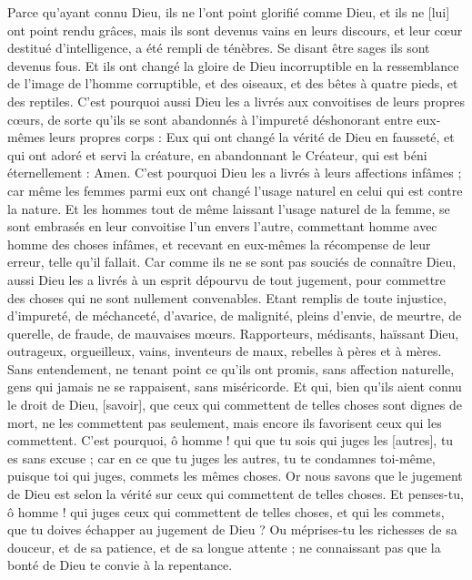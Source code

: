 \begin{multicols}{2}
Parce qu'ayant connu Dieu, ils ne l'ont point glorifié comme Dieu, et ils ne [lui] ont point rendu grâces, mais ils sont devenus vains en leurs discours, et leur cœur destitué d'intelligence, a été rempli de ténèbres.
Se disant être sages ils sont devenus fous.
Et ils ont changé la gloire de Dieu incorruptible en la ressemblance de l'image de l'homme corruptible, et des oiseaux, et des bêtes à quatre pieds, et des reptiles.
C'est pourquoi aussi Dieu les a livrés aux convoitises de leurs propres cœurs, de sorte qu'ils se sont abandonnés à l'impureté déshonorant entre eux-mêmes leurs propres corps :
Eux qui ont changé la vérité de Dieu en fausseté, et qui ont adoré et servi la créature, en abandonnant le Créateur, qui est béni éternellement : Amen.
C'est pourquoi Dieu les a livrés à leurs affections infâmes ; car même les femmes parmi eux ont changé l'usage naturel en celui qui est contre la nature.
Et les hommes tout de même laissant l'usage naturel de la femme, se sont embrasés en leur convoitise l'un envers l'autre, commettant homme avec homme des choses infâmes, et recevant en eux-mêmes la récompense de leur erreur, telle qu'il fallait.
Car comme ils ne se sont pas souciés de connaître Dieu, aussi Dieu les a livrés à un esprit dépourvu de tout jugement, pour commettre des choses qui ne sont nullement convenables.
Etant remplis de toute injustice, d'impureté, de méchanceté, d'avarice, de malignité, pleins d'envie, de meurtre, de querelle, de fraude, de mauvaises mœurs.
Rapporteurs, médisants, haïssant Dieu, outrageux, orgueilleux, vains, inventeurs de maux, rebelles à pères et à mères.
Sans entendement, ne tenant point ce qu'ils ont promis, sans affection naturelle, gens qui jamais ne se rappaisent, sans miséricorde.
Et qui, bien qu'ils aient connu le droit de Dieu, [savoir], que ceux qui commettent de telles choses sont dignes de mort, ne les commettent pas seulement, mais encore ils favorisent ceux qui les commettent.
\VerseOne{}C'est pourquoi, ô homme ! qui que tu sois qui juges les [autres], tu es sans excuse ; car en ce que tu juges les autres, tu te condamnes toi-même, puisque toi qui juges, commets les mêmes choses.
Or nous savons que le jugement de Dieu est selon la vérité sur ceux qui commettent de telles choses.
Et penses-tu, ô homme ! qui juges ceux qui commettent de telles choses, et qui les commets, que tu doives échapper au jugement de Dieu ?
Ou méprises-tu les richesses de sa douceur, et de sa patience, et de sa longue attente ; ne connaissant pas que la bonté de Dieu te convie à la repentance.

\end{multicols}
